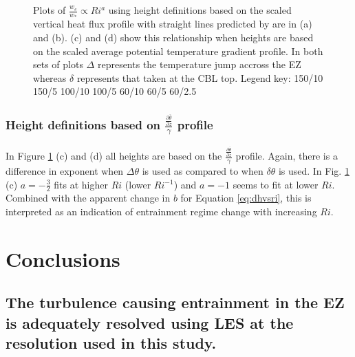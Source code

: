 \begin{figure}[htbp]
\begin{minipage}[b]{0.5\linewidth}
        \end{minipage}
        \caption{Plots of $\frac{w_{e}}{w_{*}} \propto Ri^{a}$ using height definitions based on the scaled vertical heat flux profile with straight lines predicted by \cite{GarciaMellado} are in (a) and (b).  (c) and (d) show this relationship when heights are based on the scaled average potential temperature gradient profile. In both sets of plots $\Delta$ represents the temperature jump accross the EZ whereas $\delta$ represents that taken at the CBL top. Legend key:{\color{red} } 150/10  150/5 \hspace{2mm} {\color{black} } 100/10 \hspace{2mm} {\color{black} } 100/5 \hspace{2mm} {\color{offyellow} } 60/10 \hspace{2mm} {\color{offyellow} } 60/5 \hspace{2mm} {\color{offyellow} } 60/2.5}
        \label{fig:weinvri}
\end{figure}


\subsubsection{Height definitions based on $\frac{\frac{\partial \overline{\theta}}{\partial z}}{\gamma}$ profile}
In Figure \ref{fig:weinvri} (c) and (d) all heights are based on the $\frac{\frac{\partial \overline{\theta}}{\partial z}}{\gamma}$ profile.  Again, there is a difference in exponent when $\Delta \theta$ is used as compared to when $\delta \theta$ is used.  In Fig. \ref{fig:weinvri} (c) $a=-\frac{3}{2}$ fits at higher $Ri$ (lower $Ri^{-1}$) and $a=-1$ seems to fit at lower $Ri$.  Combined with the apparent change in $b$ for Equation \ref{eq:dhvsri}, this is interpreted as an indication of entrainment regime change with increasing $Ri$.\\ 


\section{Conclusions}
\subsection{The turbulence causing entrainment in the EZ is adequately resolved using LES at the resolution used in this study.}

